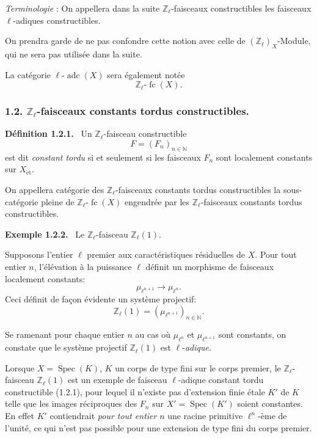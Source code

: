 \documentclass[11pt]{article}
\newenvironment{statement}[1]{\par\medskip\noindent\textbf{#1.}\ }{\par\medskip}
\DeclareMathOperator{\Spec}{Spec}
\providecommand{\fc}{\operatorname{fc}}
\providecommand{\adc}{\operatorname{adc}}
\providecommand{\Spec}{\operatorname{Spec}}
\providecommand{\Spec}{\operatorname{Spec}}
\providecommand{\Spec}{\operatorname{Spec}}
\providecommand{\Spec}{\operatorname{Spec}}
\begin{document}
\emph{Terminologie} : On appellera dans la suite \(\mathbb Z_\ell\)-faisceaux constructibles les faisceaux \(\ell\)-adiques constructibles.

On prendra garde de ne pas confondre cette notion avec celle de \((\mathbb Z_\ell)_X\)-Module, qui ne sera pas utilisée dans la suite.

La catégorie \(\ell\text{-}\adc(X)\) sera également notée
\[
\mathbb Z_\ell\text{-}\fc(X).
\]

\subsubsection*{1.2. \(\mathbb Z_\ell\)-faisceaux constants tordus constructibles.}

\begin{statement}{Définition 1.2.1}
Un \(\mathbb Z_\ell\)-faisceau constructible
\[
F=(F_n)_{n\in\mathbb N}
\]
est dit \emph{constant tordu} si et seulement si les faisceaux \(F_n\) sont localement constants sur \(X_{\mathrm{\acute et}}\).
\end{statement}

On appellera catégorie des \(\mathbb Z_\ell\)-faisceaux constants tordus constructibles la sous-catégorie pleine de \(\mathbb Z_\ell\text{-}\fc(X)\) engendrée par les \(\mathbb Z_\ell\)-faisceaux constants tordus constructibles.

\begin{statement}{Exemple 1.2.2}
Le \(\mathbb Z_\ell\)-faisceau \(\mathbb Z_\ell(1)\).
\end{statement}

Supposons l'entier \(\ell\) premier aux caractéristiques résiduelles de \(X\). Pour tout entier \(n\), l'élévation à la puissance \(\ell\) définit un morphisme de
faisceaux localement constants:
\[
\mu_{\ell^{n+1}}\longrightarrow \mu_{\ell^n}.
\]
Ceci définit de façon évidente un système projectif:
\[
\mathbb Z_\ell(1)=(\mu_{\ell^{n+1}})_{n\in\mathbb N}.
\]

Se ramenant pour chaque entier \(n\) au cas où \(\mu_{\ell^n}\) et \(\mu_{\ell^{n+1}}\) sont constants, on constate que le système projectif \(\mathbb Z_\ell(1)\) est \(\ell\)-\emph{adique}.

Lorsque \(X=\Spec(K)\), \(K\) un corps de type fini sur le corps premier, le \(\mathbb Z_\ell\)-faisceau \(\mathbb Z_\ell(1)\) est un exemple de faisceau \(\ell\)-adique constant tordu constructible (1.2.1), pour lequel il n'existe pas d'extension finie étale \(K'\) de \(K\) telle que les images réciproques des \(F_n\) sur \(X'=\Spec(K')\) soient constantes. En effet \(K'\) contiendrait \emph{pour tout entier} \(n\) une racine primitive \(\ell^n\)-ème de l'unité, ce qui n'est pas possible pour une extension de type fini du corps premier.
\end{document}
